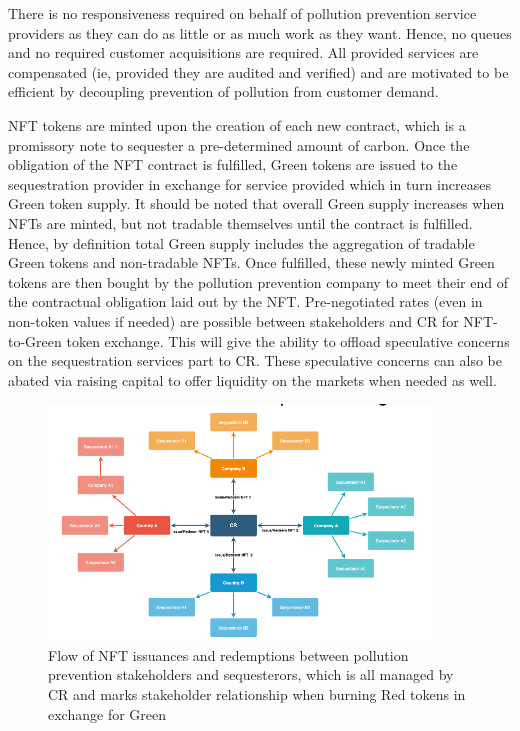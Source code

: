 \documentclass{article}
\begin{document}
There is no responsiveness required on behalf of pollution prevention service providers as they can do as little or as much work as they want. Hence, no queues and no required customer acquisitions are required. All provided services are compensated (ie, provided they are audited and verified) and are motivated to be efficient by decoupling prevention of pollution from customer demand.

NFT tokens are minted upon the creation of each new contract, which is a promissory note to sequester a pre-determined amount of carbon. Once the obligation of the NFT contract is fulfilled, Green tokens are issued to the sequestration provider in exchange for service provided which in turn increases Green token supply. It should be noted that overall Green supply increases when NFTs are minted, but not tradable themselves until the contract is fulfilled. Hence, by definition total Green supply includes the aggregation of tradable Green tokens and non-tradable NFTs. Once fulfilled, these newly minted Green tokens are then bought by the pollution prevention company to meet their end of the contractual obligation laid out by the NFT. Pre-negotiated rates (even in non-token values if needed) are possible between stakeholders and CR for NFT-to-Green token exchange. This will give the ability to offload speculative concerns on the sequestration services part to CR. These speculative concerns can also be abated via raising capital to offer liquidity on the markets when needed as well.

\begin{figure}[h]
\centering
\includegraphics[width=4in]{red_green_issue.png}
\caption{Flow of NFT issuances and redemptions between pollution prevention stakeholders and sequesterors, which is all managed by CR and marks stakeholder relationship when burning Red tokens in exchange for Green} 
\label{fig:red_green_issue}
\end{figure} 
\end{document}
